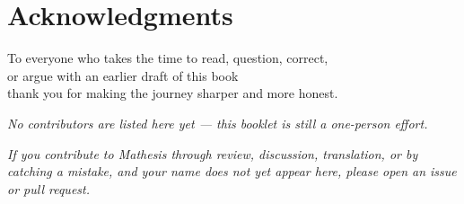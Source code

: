 \chapter*{Acknowledgments}
\thispagestyle{plain}

\vspace*{1cm}

\begin{center}
	\large
	To everyone who takes the time to read, question, correct,\\
	or argue with an earlier draft of this book\\
	thank you for making the journey sharper and more honest.
\end{center}

\vspace{0.6cm}

\begin{center}
	\small\itshape\color{textsecondary}
	No contributors are listed here yet --- this booklet is still a
	one-person effort.
\end{center}

\vfill

\begin{center}
	\small\textit{
		If you contribute to Mathesis through review, discussion,
		translation, or by catching a mistake, and your name does not
		yet appear here, please open an issue or pull request.
	}
\end{center}

\clearpage
